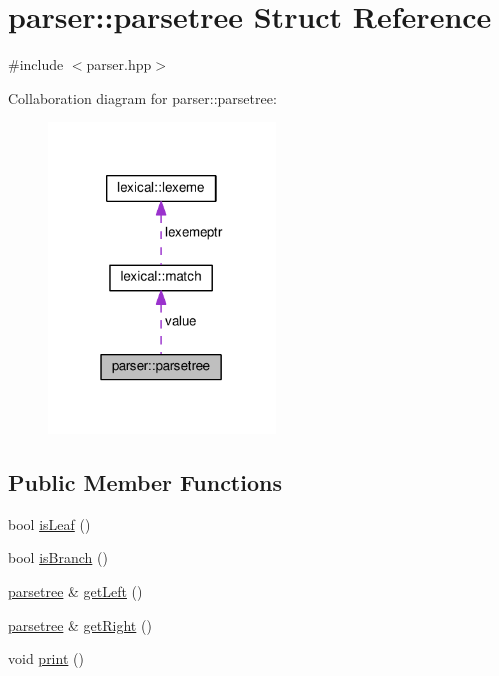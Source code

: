\hypertarget{structparser_1_1parsetree}{}\section{parser\+:\+:parsetree Struct Reference}
\label{structparser_1_1parsetree}


{\ttfamily \#include $<$parser.\+hpp$>$}



Collaboration diagram for parser\+:\+:parsetree\+:
\nopagebreak
\begin{figure}[H]
\begin{center}
\leavevmode
\includegraphics[width=171pt]{structparser_1_1parsetree__coll__graph}
\end{center}
\end{figure}
\subsection*{Public Member Functions}
\begin{DoxyCompactItemize}
\item 
bool \hyperlink{structparser_1_1parsetree_a8ba2bf7b05dd8e858edf2fab9f3d0165}{is\+Leaf} ()
\item 
bool \hyperlink{structparser_1_1parsetree_a2e876beca6bc762fa2ecb849f681f311}{is\+Branch} ()
\item 
\hyperlink{structparser_1_1parsetree}{parsetree} \& \hyperlink{structparser_1_1parsetree_a74fd9e1633a6581f3c07a6263a686bd3}{get\+Left} ()
\item 
\hyperlink{structparser_1_1parsetree}{parsetree} \& \hyperlink{structparser_1_1parsetree_a3f158cea846ac57f787eb81a9ac2477f}{get\+Right} ()
\item 
void \hyperlink{structparser_1_1parsetree_ada59e97da6280e95cf96cbb8f85df364}{print} ()
\end{DoxyCompactItemize}

